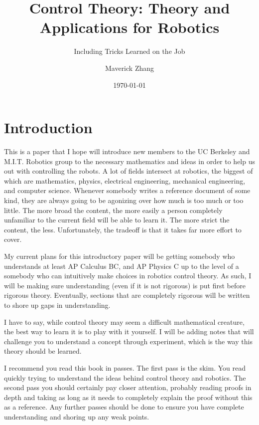 \documentclass[11pt]{scrartcl}
\begin{document}
\newcommand{\Lagr}{\mathcal{L}}
\newcommand{\Ztran}{\mathcal{Z}}

\title{Control Theory: Theory and Applications for Robotics}
\subtitle{Including Tricks Learned on the Job}
\author{Maverick Zhang}
\date{\today}
\maketitle

\newpage
\tableofcontents
\newpage

\section{Introduction}

This is a paper that I hope will introduce new members to the UC Berkeley and M.I.T. Robotics group to the necessary mathematics and ideas in order to help us out with controlling the robots. A lot of fields intersect at robotics, the biggest of which are mathematics, physics, electrical engineering, mechanical engineering, and computer science. Whenever somebody writes a reference document of some kind, they are always going to be agonizing over how much is too much or too little. The more broad the content, the more easily a person completely unfamiliar to the current field will be able to learn it. The more strict the content, the less. Unfortunately, the tradeoff is that it takes far more effort to cover. 

	My current plans for this introductory paper will be getting somebody who understands at least AP Calculus BC, and AP Physics C up to the level of a somebody who can intuitively make choices in robotics control theory. As such, I will be making sure understanding (even if it is not rigorous) is put first before rigorous theory. Eventually, sections that are completely rigorous will be written to shore up gaps in understanding. 

	I have to say, while control theory may seem a difficult mathematical creature, the best way to learn it is to play with it yourself. I will be adding notes that will challenge you to understand a concept through experiment, which is the way this theory should be learned.

	I recommend you read this book in passes. The first pass is the skim. You read quickly trying to understand the ideas behind control theory and robotics. The second pass you should certainly pay closer attention, probably reading proofs in depth and taking as long as it needs to completely explain the proof without this as a reference. Any further passes should be done to ensure you have complete understanding and shoring up any weak points.
\end{document}
